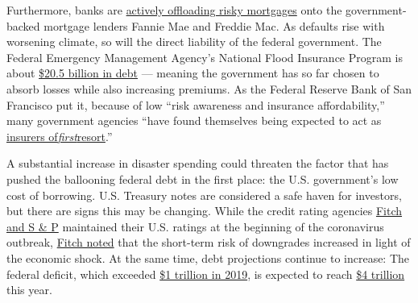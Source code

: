 Furthermore, banks are
\href{https://www.nytimes3xbfgragh.onion/2019/09/27/climate/mortgage-climate-risk.html?campaignId=7JFJX}{actively
offloading risky mortgages} onto the government-backed mortgage lenders
Fannie Mae and Freddie Mac. As defaults rise with worsening climate, so
will the direct liability of the federal government. The Federal
Emergency Management Agency's National Flood Insurance Program is about
\href{https://www.insurancejournal.com/blogs/right-street/2018/09/13/500996.htm}{\$20.5
billion in debt} --- meaning the government has so far chosen to absorb
losses while also increasing premiums. As the Federal Reserve Bank of
San Francisco put it, because of low ``risk awareness and insurance
affordability,'' many government agencies ``have found themselves being
expected to act as
\href{https://www.frbsf.org/community-development/publications/community-development-investment-review/2019/october/insurance-innovation-and-community-based-adaptation-finance/\#_ftn2}{insurers
of}\href{https://www.frbsf.org/community-development/publications/community-development-investment-review/2019/october/insurance-innovation-and-community-based-adaptation-finance/\#_ftn2}{\emph{first}}\href{https://www.frbsf.org/community-development/publications/community-development-investment-review/2019/october/insurance-innovation-and-community-based-adaptation-finance/\#_ftn2}{resort}.''

A substantial increase in disaster spending could threaten the factor
that has pushed the ballooning federal debt in the first place: the U.S.
government's low cost of borrowing. U.S. Treasury notes are considered a
safe haven for investors, but there are signs this may be changing.
While the credit rating agencies
\href{https://www.reuters.com/article/usa-ratings-sp/sp-affirms-us-amid-coronavirus-outbreak-says-debt-and-deficit-will-worsen-idUSFWN2BQ1CV}{Fitch
and S \& P} maintained their U.S. ratings at the beginning of the
coronavirus outbreak,
\href{https://www.fitchratings.com/research/us-public-finance/fitch-affirms-united-states-at-aaa-outlook-stable-26-03-2020}{Fitch
noted} that the short-term risk of downgrades increased in light of the
economic shock. At the same time, debt projections continue to increase:
The federal deficit, which exceeded
\href{https://www.nytimes3xbfgragh.onion/2020/01/13/business/budget-deficit-1-trillion-trump.html}{\$1
trillion in 2019}, is expected to reach
\href{https://www.washingtonpost.com/us-policy/2020/04/18/record-government-corporate-debt-risk-tipping-point-after-pandemic-passes/}{\$4
trillion} this year.

